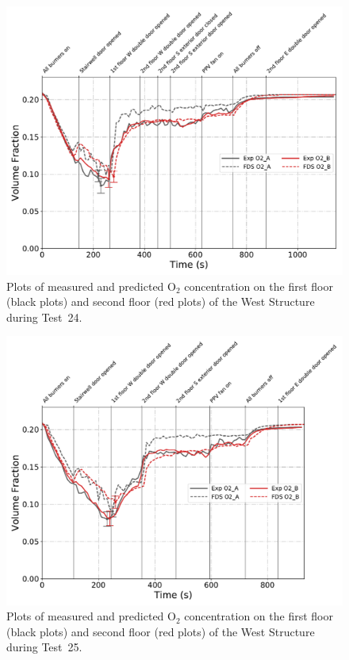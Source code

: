 \begin{figure}[!h]
	\centering
	\includegraphics[width=\columnwidth]{Figures/Plots/Validation/Gas_Concentration/Test_24_O2}
	\caption[Plots of measured and predicted O$_2$ concentration during Test~24.]{Plots of measured and predicted O$_2$ concentration on the first floor (black plots) and second floor (red plots) of the West Structure during Test~24.}
	\label{fig:Test24_O2}
\end{figure}

\begin{figure}[!h]
	\centering
	\includegraphics[width=\columnwidth]{Figures/Plots/Validation/Gas_Concentration/Test_25_O2}
	\caption[Plots of measured and predicted O$_2$ concentration during Test~25.]{Plots of measured and predicted O$_2$ concentration on the first floor (black plots) and second floor (red plots) of the West Structure during Test~25.}
	\label{fig:Test25_O2}
\end{figure}

